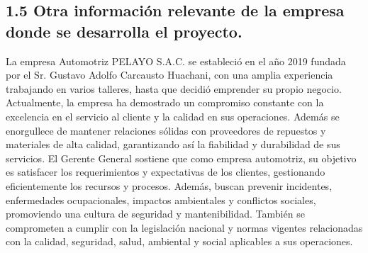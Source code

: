 \subsection{1.5 Otra información relevante de la empresa donde se desarrolla el proyecto.}
La empresa Automotriz PELAYO S.A.C. se estableció en el año 2019 fundada por el Sr. Gustavo Adolfo Carcausto Huachani, con una amplia experiencia trabajando en varios talleres, hasta que decidió emprender su propio negocio.
Actualmente, la empresa ha demostrado un compromiso constante con la excelencia en el servicio al cliente y la calidad en sus operaciones. Además se enorgullece de mantener relaciones sólidas con proveedores de repuestos y materiales de alta calidad, garantizando así la fiabilidad y durabilidad de sus servicios.
El Gerente General sostiene que como empresa automotriz, su objetivo es satisfacer los requerimientos y expectativas de los clientes, gestionando eficientemente los recursos y procesos. Además, buscan prevenir incidentes, enfermedades ocupacionales, impactos ambientales y conflictos sociales, promoviendo una cultura de seguridad y mantenibilidad. También se comprometen a cumplir con la legislación nacional y normas vigentes relacionadas con la calidad, seguridad, salud, ambiental y social aplicables a sus operaciones.
